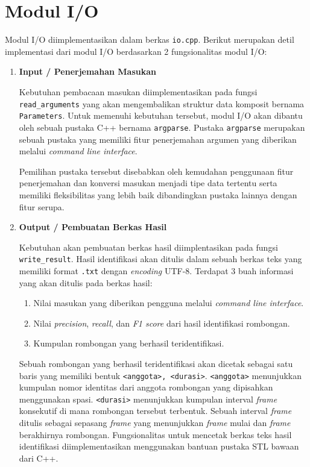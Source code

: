 \section{Modul I/O}
\label{sec:impl-io}

Modul I/O diimplementasikan dalam berkas \texttt{io.cpp}. Berikut merupakan detil implementasi dari modul I/O berdasarkan 2 fungsionalitas modul I/O:

\begin{enumerate}
    \item \textbf{Input / Penerjemahan Masukan}
    
    Kebutuhan pembacaan masukan diimplementasikan pada fungsi \texttt{read\_arguments} yang akan mengembalikan struktur data komposit bernama \texttt{Parameters}. Untuk memenuhi kebutuhan tersebut, modul I/O akan dibantu oleh sebuah pustaka C++ bernama \texttt{argparse}. Pustaka \texttt{argparse} merupakan sebuah pustaka yang memiliki fitur penerjemahan argumen yang diberikan melalui \textit{command line interface}.
    
    Pemilihan pustaka tersebut disebabkan oleh kemudahan penggunaan fitur penerjemahan dan konversi masukan menjadi tipe data tertentu serta memiliki fleksibilitas yang lebih baik dibandingkan pustaka lainnya dengan fitur serupa. 
    
    \item \textbf{Output / Pembuatan Berkas Hasil}
    
    Kebutuhan akan pembuatan berkas hasil diimplentasikan pada fungsi \texttt{write\_result}. Hasil identifikasi akan ditulis dalam sebuah berkas teks yang memiliki format \texttt{.txt} dengan \textit{encoding} UTF-8. Terdapat 3 buah informasi yang akan ditulis pada berkas hasil:
    
    \begin{enumerate}
        \item Nilai masukan yang diberikan pengguna melalui \textit{command line interface}.
        
        \item Nilai \textit{precision}, \textit{recall}, dan \textit{F1 score} dari hasil identifikasi rombongan.
        
        \item Kumpulan rombongan yang berhasil teridentifikasi.
    \end{enumerate}
    
    Sebuah rombongan yang berhasil teridentifikasi akan dicetak sebagai satu baris yang memiliki bentuk \texttt{<anggota>, <durasi>}. \texttt{<anggota>} menunjukkan kumpulan nomor identitas dari anggota rombongan yang dipisahkan menggunakan spasi. \texttt{<durasi>} menunjukkan kumpulan interval \textit{frame} konsekutif di mana rombongan tersebut terbentuk. Sebuah interval \textit{frame} ditulis sebagai sepasang \textit{frame} yang menunjukkan \textit{frame} mulai dan \textit{frame} berakhirnya rombongan. Fungsionalitas untuk mencetak berkas teks hasil identifikasi diimplementasikan menggunakan bantuan pustaka STL bawaan dari C++.
    

\end{enumerate}
